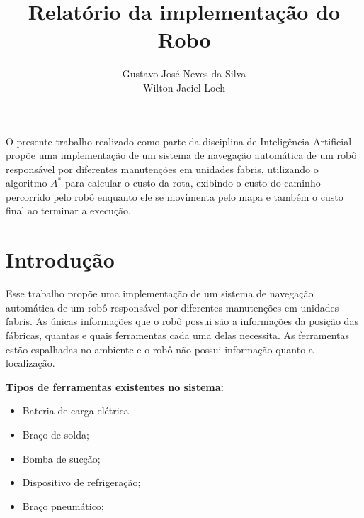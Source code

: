 \documentclass[12pt]{article}
\title{Relatório da implementação do Robo}
\author{Gustavo José Neves da Silva\inst{1}\\Wilton Jaciel Loch\inst{1}}
\begin{document}
 

\maketitle

     
\begin{resumo}
O presente trabalho realizado como parte da disciplina de Inteligência Artificial propõe uma implementação de um sistema de navegação automática de um robô responsável por diferentes manutenções em unidades fabris, utilizando o algoritmo $A^{*}$ para calcular o custo da rota, exibindo o custo do caminho percorrido pelo robô enquanto ele se movimenta pelo mapa e também o custo final ao terminar a execução.
\end{resumo}

\section{Introdução} \label{sec:Introducao}
Esse trabalho propõe uma implementação de um sistema de navegação automática de um robô responsável por diferentes manutenções em unidades fabris.
%
As únicas informações que o robô possui são a informações da posição das fábricas, quantas e quais ferramentas cada uma delas necessita.
%
As ferramentas estão espalhadas no ambiente e o robô não possui informação quanto a localização.

\textbf{Tipos de ferramentas existentes no sistema:}
\begin{itemize}
	\item Bateria de carga elétrica
	\item Braço de solda;
	\item Bomba de sucção;
	\item Dispositivo de refrigeração;
	\item Braço pneumático;
\end{itemize}
\end{document}
